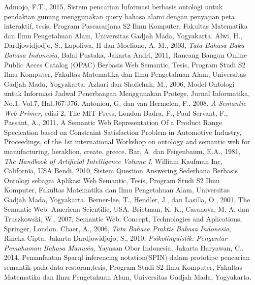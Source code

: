 \begin{thebibliography}{99}
		Admojo, F.T., 2015, Sistem pencarian Informasi berbasis ontologi untuk pendakian gunung menggunakan query bahasa alami dengan penyajian peta interaktif, tesis, Program Pascasarjana S2 Ilmu Komputer, Fakultas Matematika dan Ilmu Pengetahuan Alam, Universitas Gadjah Mada, Yogyakarta.
		Alwi, H., Dardjowidjodjo, S., Lapoliwa, H dan Moeliono, A. M., 2003, \emph{Tata Bahasa Baku Bahasa Indonesia}, Balai Pustaka, Jakarta
		Andri, 2011, Rancang Bangun Online Public Acces Catalog (OPAC) Berbasis Web Semantic, Tesis, Program Studi S2 Ilmu Komputer, Fakultas Matematika dan Ilmu Pengetahuan Alam, Universitas Gadjah Mada, Yogyakarta.
		Azhari dan Sholichah, M., 2006, Model Ontologi untuk Informasi Jadwal Penerbangan Menggunakan Protege, Jurnal Informatika, No.1, Vol.7, Hal.J67-J76.
		Antoniou, G. dan van Hermelen, F., 2008, \emph{A Semantic Web Primer}, edisi 2, The MIT Press, London
		Badra, F., Paul Servant, F., Passant, A., 2011, A Semantic Web Representation Of a Product Range Specication based on Constraint Satisfaction Problem in Automotive Industry, Proceedings, of the 1st international Workshop on ontology and semantic web for manufacturing, heraklion, create, greece.
		Bar, A. dan Feigenbaum, E.A., 1981, \emph{The Handbook of Artificial Intelligence Volume I}, William Kaufman Inc, California, USA
		Bendi, 2010, Sistem Question Answering Sederhana Berbasis Ontologi sebagai Aplikasi Web Semantic, Tesis, Program Studi S2 Ilmu Komputer, Fakultas Matematika dan Ilmu Pengetahuan Alam, Universitas Gadjah Mada, Yogyakarta.
		Berner-lee, T., Hendler, J., dan Lasilla, O., 2001, The Semantic Web. American Scientific, USA.
		Brietman, K. K., Casanova, M. A. dan Truszkowski, W., 2007, Semantic Web: Concept, Technologies and Aplications, Springer, London.
		Chaer, A., 2006, \emph{Tata Bahasa Praktis Bahasa Indonesia}, Rineka Cipta, Jakarta
		Dardjowidjojo, S., 2010, \emph{Psikolinguistik: Pengantar Pemahaman Bahasa Manusia}, Yayasan Obor Indonesia, Jakarta
		Haryawan, C., 2014, Pemanfaatan Sparql inferencing notation(SPIN) dalam prototipe pencarian semantik pada data restoran,tesis, Program Studi S2 Ilmu Komputer, Fakultas Matematika dan Ilmu Pengetahuan Alam, Universitas Gadjah Mada, Yogyakarta.

\end{thebibliography}

